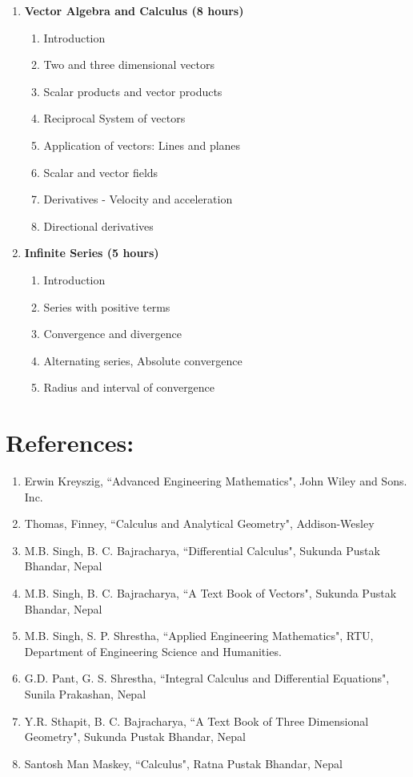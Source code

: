 \begin{enumerate}
    \item \textbf{Vector Algebra and Calculus \hfill (8 hours)}
    \begin{enumerate}
        \item Introduction
        \item Two and three dimensional vectors
        \item Scalar products and vector products
        \item Reciprocal System of vectors
        \item Application of vectors: Lines and planes
        \item Scalar and vector fields
        \item Derivatives - Velocity and acceleration
        \item Directional derivatives
    \end{enumerate}
    
    \item \textbf{Infinite Series \hfill (5 hours)}
    \begin{enumerate}
        \item Introduction
        \item Series with positive terms
        \item Convergence and divergence
        \item Alternating series, Absolute convergence
        \item Radius and interval of convergence
    \end{enumerate}
    
\end{enumerate}

\section*{References:}
\begin{enumerate}
    \item Erwin Kreyszig, ``Advanced Engineering Mathematics", John Wiley and Sons. Inc.
    \item Thomas, Finney, ``Calculus and Analytical Geometry", Addison-Wesley
    \item M.B. Singh, B. C. Bajracharya, ``Differential Calculus", Sukunda Pustak Bhandar, Nepal
    \item M.B. Singh, B. C. Bajracharya, ``A Text Book of Vectors", Sukunda Pustak Bhandar, Nepal
    \item M.B. Singh, S. P. Shrestha, ``Applied Engineering Mathematics", RTU, Department of Engineering Science and Humanities.
    \item G.D. Pant, G. S. Shrestha, ``Integral Calculus and Differential Equations", Sunila Prakashan, Nepal
    \item Y.R. Sthapit, B. C. Bajracharya, ``A Text Book of Three Dimensional Geometry", Sukunda Pustak Bhandar, Nepal
    \item Santosh Man Maskey, ``Calculus", Ratna Pustak Bhandar, Nepal
\end{enumerate}